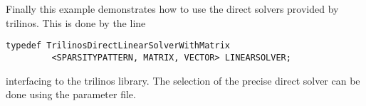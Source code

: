 Finally this example demonstrates how to use the direct solvers provided by trilinos. 
This is done by the line 
\begin{verbatim}
typedef TrilinosDirectLinearSolverWithMatrix
         <SPARSITYPATTERN, MATRIX, VECTOR> LINEARSOLVER;
\end{verbatim}
interfacing to the trilinos library. The selection of the precise direct solver can 
be done using the parameter file.